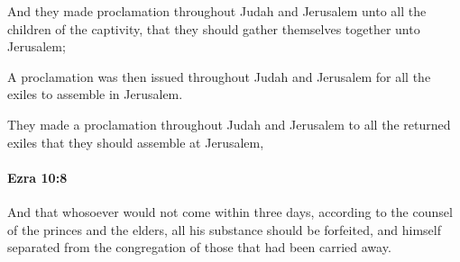 			\begin{versebox}
					\item[BHS] 
					\item[LXX] 
					\item[ASV] And they made proclamation throughout Judah and Jerusalem unto all the children of the captivity, that they should gather themselves together unto Jerusalem;
					\item[NIV] A proclamation was then issued throughout Judah and Jerusalem for all the exiles to assemble in Jerusalem.
					\item[NRSV] They made a proclamation throughout Judah and Jerusalem to all the returned exiles that they should assemble at Jerusalem,
			\end{versebox}

		\paragraph{Ezra 10:8} %
			\label{EZRA-10-8}

			And that whosoever would not come within three days, according to the counsel of the princes and the elders, all his substance should be forfeited, and himself separated from the congregation of those that had been carried away.

